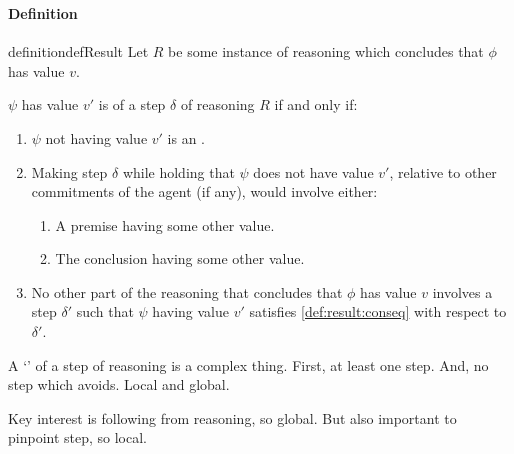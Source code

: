 \subsubsection{}
\label{sec:def-of-result}

\paragraph{Definition}

\begin{note}
  \begin{restatable}{definition}{defResult}
    \label{def:result}
    Let \(R\) be some instance of reasoning which concludes that \(\phi\) has value \(v\).

    \(\psi\) has value \(v'\) is \emph{\result{}} of a step \(\delta\) of reasoning \(R\) if and only if:
    \begin{enumerate}[label=\arabic*., ref=\named{P:\arabic*}]
    \item
      \label{def:result:ep}
      \(\psi\) not having value \(v'\) is an \ep{}.
    \item
      \label{def:result:conseq}
      Making step \(\delta\) while holding that \(\psi\) does not have value \(v'\), relative to other commitments of the agent (if any), would involve either:
      \begin{enumerate}[label=\alph*., ref=\named{P:2\alph*}]
      \item
        \label{def:result:conseq:a}
        A premise having some other value.
      \item
        \label{def:result:conseq:c}
        The conclusion having some other value.
      \end{enumerate}
    \item
      \label{def:requ:persists}
      No other part of the reasoning that concludes that \(\phi\) has value \(v\) involves a step \(\delta'\) such that \(\psi\) having value \(v'\) satisfies \ref{def:result:conseq} with respect to \(\delta'\).
    \end{enumerate}
    \vspace{-\baselineskip}
  \end{restatable}
\end{note}

\begin{note}
  A `\result{}' of a step of reasoning is a complex thing.
  First, at least one step.
  And, no step which avoids.
  Local and global.

  Key interest is following from reasoning, so global.
  But also important to pinpoint step, so local.
\end{note}

